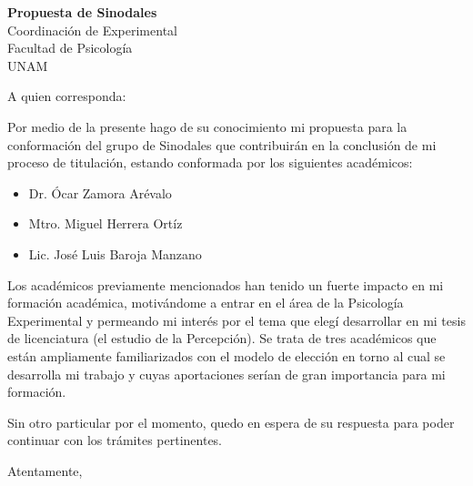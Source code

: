 \documentclass[10pt]{letter} %
\begin{document}

\begin{letter}{\textbf{Propuesta de Sinodales} \\ Coordinación de Experimental \\ Facultad de Psicología \\ UNAM} %


\opening{A quien corresponda:}

Por medio de la presente hago de su conocimiento mi propuesta para la conformación del grupo de Sinodales que contribuirán en la conclusión de mi proceso de titulación, estando conformada por los siguientes académicos:\\

\begin{itemize}
\item Dr. Ócar Zamora Arévalo\\

\item Mtro. Miguel Herrera Ortíz\\

\item Lic. José Luis Baroja Manzano\\
\end{itemize}

Los académicos previamente mencionados han tenido un fuerte impacto en mi formación académica, motivándome a entrar en el área de la Psicología Experimental y permeando mi interés por el tema que elegí desarrollar en mi tesis de licenciatura (el estudio de la Percepción). Se trata de tres académicos que están ampliamente familiarizados con el modelo de elección en torno al cual se desarrolla mi trabajo y cuyas aportaciones serían de gran importancia para mi formación.

Sin otro particular por el momento, quedo en espera de su respuesta para poder continuar con los trámites pertinentes.

\vspace{2\parskip} %
\closing{Atentamente,}
\vspace{2\parskip} %




\end{letter}
 
\end{document}
